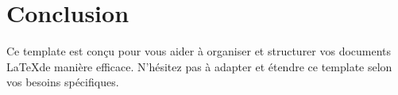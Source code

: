 \section{Conclusion}
Ce template est conçu pour vous aider à organiser et structurer vos documents \LaTeX de manière efficace. N'hésitez pas à adapter et étendre ce template selon vos besoins spécifiques.


\medskip



